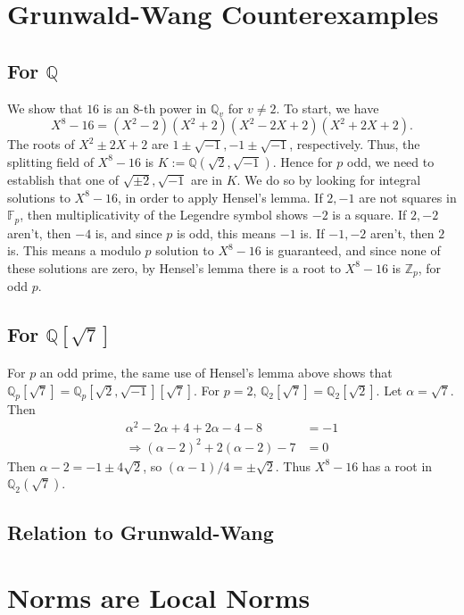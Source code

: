 \documentclass[11pt]{amsart}
\theoremstyle{named}
\newcommand{\Z}{\mathbb{Z}}
\newcommand{\Q}{\mathbb{Q}}
\begin{document}
\section{Grunwald-Wang Counterexamples}

\subsection{For $\Q$} We show that $16$ is an $8$-th power in $\Q_v$ for
$v \neq 2$. To start, we have
\[ X^8 - 16 = (X^2 - 2 )(X^2 + 2)(X^2 - 2X + 2)(X^2 + 2X + 2). \]
The roots of $X^2 \pm 2X + 2$ are $1 \pm \sqrt{-1}, -1 \pm \sqrt{-1}$,
respectively. Thus, the splitting field of $X^8 - 16$ is
$K := \Q(\sqrt{2}, \sqrt{-1})$. Hence for $p$ odd, we need to establish that one
of $\sqrt{\pm 2}, \sqrt{-1}$ are in $K$. We do so by looking for integral
solutions  to $X^8 - 16$, in order to apply Hensel's lemma. If $2, -1$ are not
squares in $\mathbb{F}_p$, then multiplicativity of the Legendre symbol shows
$-2$ is a square. If $2, -2$ aren't, then $-4$ is, and since $p$ is odd, this
means $-1$ is. If $-1, -2$ aren't, then $2$ is. This means a modulo $p$ solution
to $X^8 - 16$ is guaranteed, and since none of these solutions are zero, by
Hensel's lemma there is a root to $X^8 - 16$ is $\Z_p$, for odd $p$.

\subsection{For $\mathbb{Q}[\sqrt{7}]$} For $p$ an odd prime, the same use of
Hensel's lemma above shows that
$\Q_p[\sqrt{7}] = \Q_p[\sqrt{2}, \sqrt{-1}][\sqrt{7}].$ For $p = 2$,
$\Q_2[\sqrt{7}] = \Q_2[\sqrt{2}]$. Let $\alpha = \sqrt{7}$. Then
\begin{align*}
  \alpha^2 - 2\alpha + 4 + 2\alpha - 4  - 8 & = -1 \\
  \Rightarrow (\alpha -2)^2 + 2(\alpha - 2) - 7 & = 0
\end{align*}
Then $\alpha - 2 = -1 \pm 4\sqrt{2}$, so $(\alpha - 1)/4 = \pm \sqrt{2}$. Thus
$X^8 - 16$ has a root in $\Q_2(\sqrt{7})$.

\subsection{Relation to Grunwald-Wang} 


\section{Norms are Local Norms}
\end{document}
